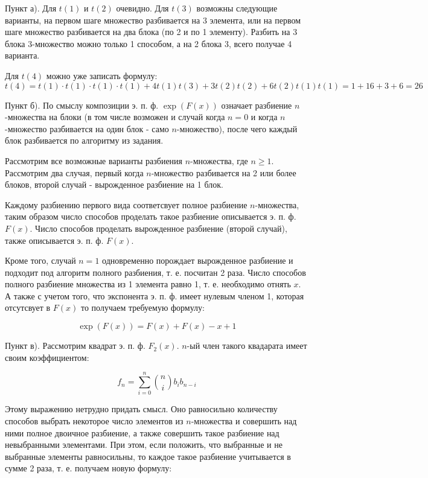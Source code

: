 \documentclass[a4paper,12pt]{article}
\begin{document}
\begin{Solution}
Пункт а). Для $t\left(1\right)$ и $t\left(2\right)$ очевидно. Для $t\left(3\right)$ возможны следующие варианты, на первом шаге множество разбивается на 3 элемента, или на первом шаге множество разбивается на два блока (по 2 и по 1 элементу). Разбить на 3 блока 3-множество можно только 1 способом, а на 2 блока 3, всего получае 4 варианта.

Для $t\left(4\right)$ можно уже записать формулу:
\[
	t\left(4\right) = t\left(1\right)\cdot t\left(1\right)\cdot t\left(1\right)\cdot t\left(1\right) + 4 t\left(1\right)t\left(3\right) + 3 t\left(2\right)t\left(2\right) + 6 t\left(2\right) t\left(1\right) t\left(1\right) = 1 + 16 + 3 + 6 = 26
\]

Пункт б). По смыслу композиции э. п. ф. $\exp\left(F\left(x\right)\right)$ означает разбиение $n$-множества на блоки (в том числе возможен и случай когда $n=0$ и когда $n$-множество разбивается на один блок - само $n$-множество), после чего каждый блок разбивается по алгоритму из задания.

Рассмотрим все возможные варианты разбиения $n$-множества, где $n\ge1$. Рассмотрим два случая, первый когда $n$-множество разбивается на 2 или более блоков, второй случай - вырожденное разбиение на 1 блок.

Каждому разбиению первого вида соответсвует полное разбиение $n$-множества, таким образом число способов проделать такое разбиение описывается э. п. ф. $F\left(x\right)$. Число способов проделать вырожденное разбиение (второй случай), также описывается э. п. ф. $F\left(x\right)$.

Кроме того, случай $n = 1$ одновременно порождает вырожденное разбиение и подходит под алгоритм полного разбиения, т. е. посчитан 2 раза. Число способов полного разбиение множества из 1 элемента равно 1, т. е. необходимо отнять $x$. А также с учетом того, что экспонента э. п. ф. имеет нулевым членом 1, которая отсутсвует в $F\left(x\right)$ то получаем требуемую формулу:

\[
	\exp\left(F\left(x\right)\right) = F\left(x\right) + F\left(x\right) - x + 1
\]

Пункт в). Рассмотрим квадрат э. п. ф. $F_2\left(x\right)$. $n$-ый член такого квадарата имеет своим коэффициентом:

\[
	f_n = \sum_{i=0}^n \binom{n}{i} b_i b_{n-i}
\]

Этому выражению нетрудно придать смысл. Оно равносильно количеству способов выбрать некоторое число элементов из $n$-множества и совершить над ними полное двоичное разбиение, а также совершить такое разбиение над невыбранными элементами. При этом, если положить, что выбранные и не выбранные элементы равносильны, то каждое такое разбиение учитывается в сумме 2 раза, т. е. получаем новую формулу:


\end{Solution}
\end{document}
